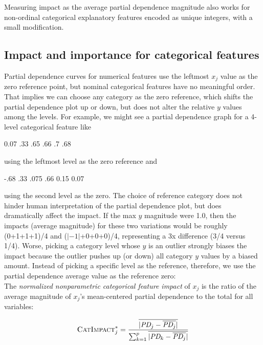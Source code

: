 \documentclass[11pt]{article}
\newcommand{\CImp}{\fontfamily{cmr}\textsc{CatImpact}}
\begin{document}
Measuring impact as the average partial dependence magnitude also works for non-ordinal categorical explanatory features encoded as unique integers, with a small modification.  

\subsection{Impact and importance for categorical features}

Partial dependence curves for numerical features use the leftmost $x_j$ value as the zero reference point, but nominal categorical features have no meaningful order. That implies we can choose any category as the zero reference, which shifts the partial dependence plot up or down, but does not alter the relative $y$ values among the levels. For example, we might see a partial dependence graph for a 4-level categorical feature like \begin{sparkline}{2.5}
 0.07
\sparkspike .33 .65
\sparkspike .66 .7
 .68
\end{sparkline} using the leftmost level as the zero reference and \begin{sparkline}{2.5}
 -.68
\sparkspike .33 .075
\sparkspike .66 0.15
 0.07
\end{sparkline} using the second level as the zero. The choice of reference category does not hinder human interpretation of the partial dependence plot, but does dramatically affect the impact.  If the max $y$  magnitude were 1.0, then the impacts (average magnitude) for these two variations would be roughly (0+1+1+1)/4 and ($|-1|$+0+0+0)/4, representing a 3x difference (3/4 versus 1/4). Worse, picking a category level whose $y$ is an outlier strongly biases the impact because the outlier pushes up (or down) all category $y$ values by a biased amount.  Instead of picking a specific level as the reference, therefore, we use the partial dependence average value as the reference zero:\\

 The {\em normalized nonparametric categorical feature impact} of $x_j$ is the ratio of the average magnitude of $x_j$'s mean-centered partial dependence to the total for all variables:

\begin{equation}\label{eq:Cpd4a}
\CImp_j^{*} = \frac{\overline{|\text{\it PD}_j - \overline{\text{\it PD}_j}|}}{\sum_{k=1}^p \overline{|\text{\it PD}_k - \overline{\text{\it PD}_j}|}}
\end{equation}
\end{document}
